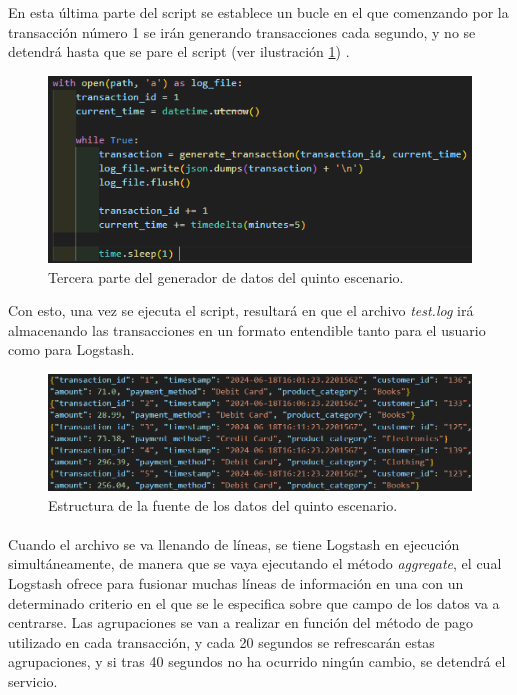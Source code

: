 En esta última parte del script se establece un bucle en el que comenzando por la transacción número 1 se irán generando transacciones cada segundo, y no se detendrá hasta que se pare el script (ver ilustración \ref{fig:generador3}) .
\begin{figure}
    \centering
    \includegraphics[width=1\linewidth]{img/escenario53.png}
    \caption{Tercera parte del generador de datos del quinto escenario.}
    \label{fig:generador3}
\end{figure}

Con esto, una vez se ejecuta el script, resultará en que el archivo \textit{test.log} irá almacenando las transacciones en un formato entendible tanto para el usuario como para Logstash.

\begin{figure}
    \centering
    \includegraphics[width=1\linewidth]{img/pantallazo.png}
    \caption{Estructura de la fuente de los datos del quinto escenario.}
    \label{fig:salida3}
\end{figure}
\paragraph{}
\paragraph{}

Cuando el archivo se va llenando de líneas, se tiene Logstash en ejecución simultáneamente, de manera que se vaya ejecutando el método \textit{aggregate}, el cual Logstash ofrece para fusionar muchas líneas de información en una con un determinado criterio en el que se le especifica sobre que campo de los datos va a centrarse. Las agrupaciones se van a realizar en función del método de pago utilizado en cada transacción, y cada 20 segundos se refrescarán estas agrupaciones, y si tras 40 segundos no ha ocurrido ningún cambio, se detendrá el servicio.


